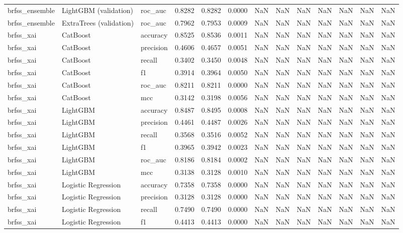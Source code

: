 \begin{tabular}{lllrrrllrrrrr}
brfss\_ensemble & LightGBM (validation) & roc\_auc & 0.8282 & 0.8282 & 0.0000 & NaN & NaN & NaN & NaN & NaN & NaN & NaN \\
brfss\_ensemble & ExtraTrees (validation) & roc\_auc & 0.7962 & 0.7953 & 0.0009 & NaN & NaN & NaN & NaN & NaN & NaN & NaN \\
brfss\_xai & CatBoost & accuracy & 0.8525 & 0.8536 & 0.0011 & NaN & NaN & NaN & NaN & NaN & NaN & NaN \\
brfss\_xai & CatBoost & precision & 0.4606 & 0.4657 & 0.0051 & NaN & NaN & NaN & NaN & NaN & NaN & NaN \\
brfss\_xai & CatBoost & recall & 0.3402 & 0.3450 & 0.0048 & NaN & NaN & NaN & NaN & NaN & NaN & NaN \\
brfss\_xai & CatBoost & f1 & 0.3914 & 0.3964 & 0.0050 & NaN & NaN & NaN & NaN & NaN & NaN & NaN \\
brfss\_xai & CatBoost & roc\_auc & 0.8211 & 0.8211 & 0.0000 & NaN & NaN & NaN & NaN & NaN & NaN & NaN \\
brfss\_xai & CatBoost & mcc & 0.3142 & 0.3198 & 0.0056 & NaN & NaN & NaN & NaN & NaN & NaN & NaN \\
brfss\_xai & LightGBM & accuracy & 0.8487 & 0.8495 & 0.0008 & NaN & NaN & NaN & NaN & NaN & NaN & NaN \\
brfss\_xai & LightGBM & precision & 0.4461 & 0.4487 & 0.0026 & NaN & NaN & NaN & NaN & NaN & NaN & NaN \\
brfss\_xai & LightGBM & recall & 0.3568 & 0.3516 & 0.0052 & NaN & NaN & NaN & NaN & NaN & NaN & NaN \\
brfss\_xai & LightGBM & f1 & 0.3965 & 0.3942 & 0.0023 & NaN & NaN & NaN & NaN & NaN & NaN & NaN \\
brfss\_xai & LightGBM & roc\_auc & 0.8186 & 0.8184 & 0.0002 & NaN & NaN & NaN & NaN & NaN & NaN & NaN \\
brfss\_xai & LightGBM & mcc & 0.3138 & 0.3128 & 0.0010 & NaN & NaN & NaN & NaN & NaN & NaN & NaN \\
brfss\_xai & Logistic Regression & accuracy & 0.7358 & 0.7358 & 0.0000 & NaN & NaN & NaN & NaN & NaN & NaN & NaN \\
brfss\_xai & Logistic Regression & precision & 0.3128 & 0.3128 & 0.0000 & NaN & NaN & NaN & NaN & NaN & NaN & NaN \\
brfss\_xai & Logistic Regression & recall & 0.7490 & 0.7490 & 0.0000 & NaN & NaN & NaN & NaN & NaN & NaN & NaN \\
brfss\_xai & Logistic Regression & f1 & 0.4413 & 0.4413 & 0.0000 & NaN & NaN & NaN & NaN & NaN & NaN & NaN \\

\end{tabular}
